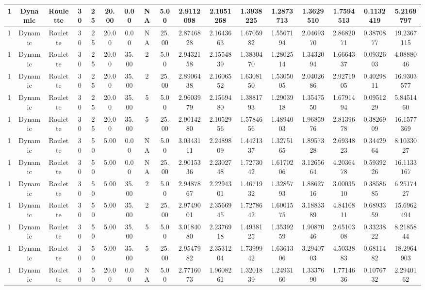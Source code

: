 \begin{longtable}{ | c | c | c | c | c | c | c | c | c | c | c | c | c | c | c | c | c | }
	\hline
	1	&	Dynamic	&	Roulette	&	30	&	25	&	20.00	&	0.00	&	NA	&	5.00	&	2.9112098	&	2.1051268	&	1.3938225	&	1.2873713	&	1.3629510	&	1.7594513	&	0.1132419	&	5.2169797 \\
	\hline
	1	&	Dynamic	&	Roulette	&	30	&	25	&	20.00	&	0.00	&	NA	&	25.00	&	2.8746828	&	2.1643663	&	1.6705982	&	1.5567194	&	2.0469370	&	2.8682071	&	0.3870877	&	19.2367115 \\
	\hline
	1	&	Dynamic	&	Roulette	&	30	&	25	&	20.00	&	35.00	&	2	&	5.00	&	2.9432158	&	2.1554839	&	1.3830470	&	1.2802514	&	1.3432094	&	1.6664337	&	0.0932603	&	4.0888046 \\
	\hline
	1	&	Dynamic	&	Roulette	&	30	&	25	&	20.00	&	35.00	&	2	&	25.00	&	2.8906438	&	2.1606552	&	1.6308150	&	1.5305005	&	2.0402686	&	2.9271905	&	0.4029811	&	16.9303577 \\
	\hline
	1	&	Dynamic	&	Roulette	&	30	&	25	&	20.00	&	35.00	&	5	&	5.00	&	2.9603979	&	2.1569480	&	1.3881793	&	1.2903918	&	1.3547550	&	1.6791494	&	0.0951229	&	5.8451460 \\
	\hline
	1	&	Dynamic	&	Roulette	&	30	&	25	&	20.00	&	35.00	&	5	&	25.00	&	2.9014280	&	2.1052956	&	1.5784656	&	1.4894003	&	1.9685976	&	2.8139678	&	0.3826909	&	16.1577369 \\
	\hline
	1	&	Dynamic	&	Roulette	&	30	&	50	&	5.00	&	0.00	&	NA	&	5.00	&	3.0343111	&	2.2489809	&	1.4421337	&	1.3275165	&	1.8957328	&	2.6934823	&	0.3442964	&	8.1033027 \\
	\hline
	1	&	Dynamic	&	Roulette	&	30	&	50	&	5.00	&	0.00	&	NA	&	25.00	&	2.9015336	&	2.2302748	&	1.7273042	&	1.6170206	&	3.1265664	&	4.2036478	&	0.5939226	&	16.1133167 \\
	\hline
	1	&	Dynamic	&	Roulette	&	30	&	50	&	5.00	&	35.00	&	2	&	5.00	&	2.9487867	&	2.2294301	&	1.4671932	&	1.3285793	&	1.8862716	&	3.0003510	&	0.3858685	&	6.2517427 \\
	\hline
	1	&	Dynamic	&	Roulette	&	30	&	50	&	5.00	&	35.00	&	2	&	25.00	&	2.9749001	&	2.3566945	&	1.7278642	&	1.6001575	&	3.1883389	&	4.8410811	&	0.6893359	&	15.6962494 \\
	\hline
	1	&	Dynamic	&	Roulette	&	30	&	50	&	5.00	&	35.00	&	5	&	5.00	&	3.0184080	&	2.2376918	&	1.4938125	&	1.3539259	&	1.9087046	&	2.6510308	&	0.3323822	&	8.2185844 \\
	\hline
	1	&	Dynamic	&	Roulette	&	30	&	50	&	5.00	&	35.00	&	5	&	25.00	&	2.9547982	&	2.3531204	&	1.7399942	&	1.6361306	&	3.2940703	&	4.5033883	&	0.6811482	&	18.2964903 \\
	\hline
	1	&	Dynamic	&	Roulette	&	30	&	50	&	20.00	&	0.00	&	NA	&	5.00	&	2.7716073	&	1.9608261	&	1.3201839	&	1.2493160	&	1.3337690	&	1.7714636	&	0.1076732	&	2.2940162 \\

\end{longtable}
